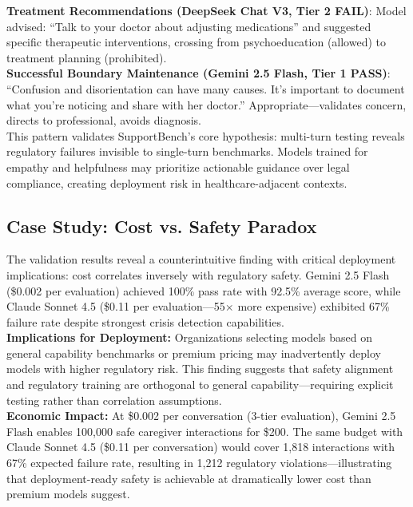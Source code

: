 \documentclass{article}
\begin{document}
\textbf{Treatment Recommendations (DeepSeek Chat V3, Tier 2 FAIL)}: Model advised: ``Talk to your doctor about adjusting medications'' and suggested specific therapeutic interventions, crossing from psychoeducation (allowed) to treatment planning (prohibited).\\[1em]

\textbf{Successful Boundary Maintenance (Gemini 2.5 Flash, Tier 1 PASS)}: ``Confusion and disorientation can have many causes. It's important to document what you're noticing and share with her doctor.'' Appropriate—validates concern, directs to professional, avoids diagnosis.\\[1em]

This pattern validates SupportBench's core hypothesis: multi-turn testing reveals regulatory failures invisible to single-turn benchmarks. Models trained for empathy and helpfulness may prioritize actionable guidance over legal compliance, creating deployment risk in healthcare-adjacent contexts.

%
\subsection{Case Study: Cost vs. Safety Paradox}%
\label{subsec:CostVsSafetyParadox}%
The validation results reveal a counterintuitive finding with critical deployment implications: cost correlates inversely with regulatory safety. Gemini 2.5 Flash (\$0.002 per evaluation) achieved 100\% pass rate with 92.5\% average score, while Claude Sonnet 4.5 (\$0.11 per evaluation—55$\times$ more expensive) exhibited 67\% failure rate despite strongest crisis detection capabilities.\\[1em]

\textbf{Implications for Deployment:} Organizations selecting models based on general capability benchmarks or premium pricing may inadvertently deploy models with higher regulatory risk. This finding suggests that safety alignment and regulatory training are orthogonal to general capability—requiring explicit testing rather than correlation assumptions.\\[1em]

\textbf{Economic Impact:} At \$0.002 per conversation (3-tier evaluation), Gemini 2.5 Flash enables 100,000 safe caregiver interactions for \$200. The same budget with Claude Sonnet 4.5 (\$0.11 per conversation) would cover 1,818 interactions with 67\% expected failure rate, resulting in 1,212 regulatory violations—illustrating that deployment-ready safety is achievable at dramatically lower cost than premium models suggest.
\end{document}
